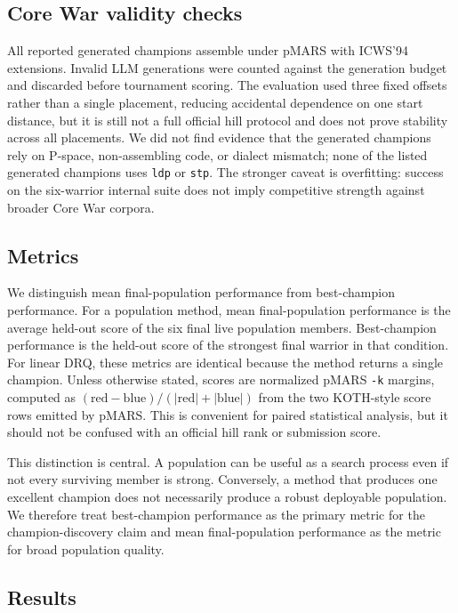 \documentclass[11pt]{article}
\begin{document}
\subsection{Core War validity checks}

All reported generated champions assemble under pMARS with ICWS'94 extensions. Invalid LLM generations were counted against the generation budget and discarded before tournament scoring. The evaluation used three fixed offsets rather than a single placement, reducing accidental dependence on one start distance, but it is still not a full official hill protocol and does not prove stability across all placements. We did not find evidence that the generated champions rely on P-space, non-assembling code, or dialect mismatch; none of the listed generated champions uses \texttt{ldp} or \texttt{stp}. The stronger caveat is overfitting: success on the six-warrior internal suite does not imply competitive strength against broader Core War corpora.

\subsection{Metrics}

We distinguish mean final-population performance from best-champion performance. For a population method, mean final-population performance is the average held-out score of the six final live population members. Best-champion performance is the held-out score of the strongest final warrior in that condition. For linear DRQ, these metrics are identical because the method returns a single champion. Unless otherwise stated, scores are normalized pMARS \texttt{-k} margins, computed as $(\mathrm{red}-\mathrm{blue})/(|\mathrm{red}|+|\mathrm{blue}|)$ from the two KOTH-style score rows emitted by pMARS. This is convenient for paired statistical analysis, but it should not be confused with an official hill rank or submission score.

This distinction is central. A population can be useful as a search process even if not every surviving member is strong. Conversely, a method that produces one excellent champion does not necessarily produce a robust deployable population. We therefore treat best-champion performance as the primary metric for the champion-discovery claim and mean final-population performance as the metric for broad population quality.

\subsection{Results}
\end{document}
